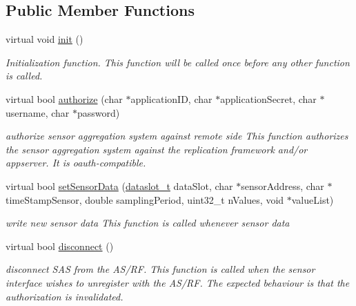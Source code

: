 \subsection*{Public Member Functions}
\begin{DoxyCompactItemize}
\item 
\hypertarget{classhe2mt_s_d_i_rest_a58491a38bc87bfee5dac76cbee00a38b}{virtual void \hyperlink{classhe2mt_s_d_i_rest_a58491a38bc87bfee5dac76cbee00a38b}{init} ()}\label{classhe2mt_s_d_i_rest_a58491a38bc87bfee5dac76cbee00a38b}

\begin{DoxyCompactList}\small\item\em Initialization function. This function will be called once before any other function is called. \end{DoxyCompactList}\item 
virtual bool \hyperlink{classhe2mt_s_d_i_rest_a0329117af57c9da6e436278c8df04a81}{authorize} (char $\ast$application\-I\-D, char $\ast$application\-Secret, char $\ast$username, char $\ast$password)
\begin{DoxyCompactList}\small\item\em authorize sensor aggregation system against remote side This function authorizes the sensor aggregation system against the replication framework and/or appserver. It is oauth-\/compatible. \end{DoxyCompactList}\item 
virtual bool \hyperlink{classhe2mt_s_d_i_rest_a954e27119d8e8f5209146afa975711eb}{set\-Sensor\-Data} (\hyperlink{classhe2mt_s_d_i_ad0bd9136f18c52d27b93cfca85bf05dd}{dataslot\-\_\-t} data\-Slot, char $\ast$sensor\-Address, char $\ast$time\-Stamp\-Sensor, double sampling\-Period, uint32\-\_\-t n\-Values, void $\ast$value\-List)
\begin{DoxyCompactList}\small\item\em write new sensor data This function is called whenever sensor data \end{DoxyCompactList}\item 
virtual bool \hyperlink{classhe2mt_s_d_i_rest_a6af63eeedd983928ffed540a244218f3}{disconnect} ()
\begin{DoxyCompactList}\small\item\em disconnect S\-A\-S from the A\-S/\-R\-F. This function is called when the sensor interface wishes to unregister with the A\-S/\-R\-F. The expected behaviour is that the authorization is invalidated. \end{DoxyCompactList}\item 

\end{DoxyCompactItemize}
